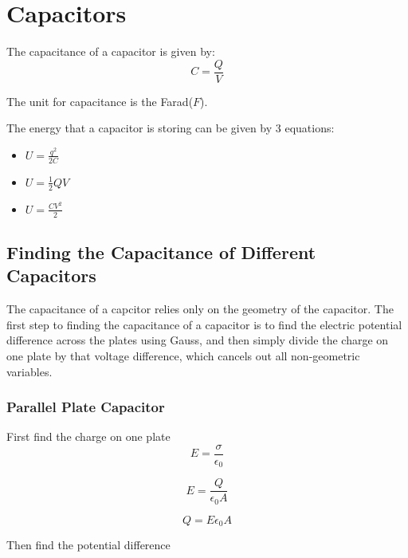 \documentclass[a4paper,12pt]{article}
\begin{document}
						



	\section{Capacitors}
		The capacitance of a capacitor is given by:
			\begin{equation*}
					C = \frac{Q}{V} 
			\end{equation*}

		The unit for capacitance is the Farad($F$).

		The energy that a capacitor is storing can be given by 3 equations:
		\begin{itemize}
				\item $U = \frac{q^{2}}{2C}$
				\item $U = \frac{1}{2} QV$
				\item $U = \frac{CV^{2}}{2}$
		\end{itemize}

		\subsection{Finding the Capacitance of Different Capacitors}

			The capacitance of a capcitor relies only on the geometry of the capacitor. The first step to finding the capacitance of a capacitor is to find the electric potential difference across the plates using Gauss, and then simply divide the charge on one plate by that voltage difference, which cancels out all non-geometric variables.

			\subsubsection{Parallel Plate Capacitor}
				First find the charge on one plate
				\begin{equation*}
						E = \frac{\sigma}{\epsilon_{0}}
				\end{equation*}

				\begin{equation*}
						E = \frac{Q}{\epsilon_{0}A} 
				\end{equation*}

				\begin{equation*}
						Q = E\epsilon_{0}A
				\end{equation*}

				Then find the potential difference
				
\end{document}
